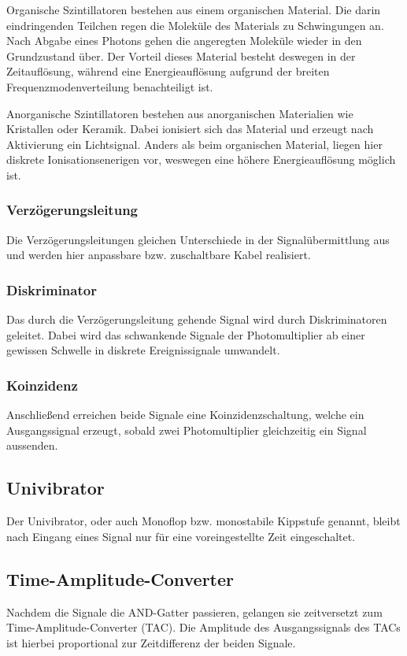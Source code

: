 Organische Szintillatoren bestehen aus einem organischen Material.
Die darin eindringenden Teilchen regen die Moleküle des Materials zu Schwingungen an. 
Nach Abgabe eines Photons gehen die angeregten Moleküle wieder in den Grundzustand über.
Der Vorteil dieses Material besteht deswegen in der Zeitauflösung, 
während eine Energieauflösung aufgrund der breiten Frequenzmodenverteilung benachteiligt ist.

Anorganische Szintillatoren bestehen aus anorganischen Materialien wie Kristallen oder Keramik. 
Dabei ionisiert sich das Material und erzeugt nach Aktivierung ein Lichtsignal.
Anders als beim organischen Material, liegen hier diskrete Ionisationsenerigen vor,
weswegen eine höhere Energieauflösung möglich ist.

\subsubsection*{Verzögerungsleitung}
Die Verzögerungsleitungen gleichen Unterschiede in der Signalübermittlung aus
und werden hier anpassbare bzw. zuschaltbare Kabel realisiert.

\subsubsection*{Diskriminator}
Das durch die Verzögerungsleitung gehende Signal wird durch Diskriminatoren geleitet.
Dabei wird das schwankende Signale der Photomultiplier ab einer gewissen Schwelle in diskrete
Ereignissignale umwandelt.

\subsubsection*{Koinzidenz}
Anschließend erreichen beide Signale eine Koinzidenzschaltung, welche ein Ausgangssignal
erzeugt, sobald zwei Photomultiplier gleichzeitig ein Signal aussenden.

\subsection*{Univibrator}
Der Univibrator, oder auch Monoflop bzw. monostabile Kippstufe genannt,
bleibt nach Eingang eines Signal nur für eine voreingestellte Zeit eingeschaltet.

\subsection*{Time-Amplitude-Converter}
Nachdem die Signale die AND-Gatter passieren, 
gelangen sie zeitversetzt zum Time-Amplitude-Converter (TAC).
Die Amplitude des Ausgangssignals des TACs ist hierbei proportional zur Zeitdifferenz der beiden Signale.

